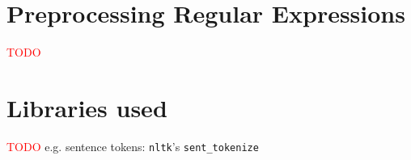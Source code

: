 \section{Preprocessing Regular Expressions}
\label{app:regex_preproc}

\textcolor{red}{TODO}







\section{Libraries used}
\label{app:libraries}

\textcolor{red}{TODO}
e.g. sentence tokens: \texttt{nltk}'s \texttt{sent\_tokenize}